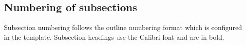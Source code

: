 \documentclass[10pt]{imeko_acta}
\begin{document}
\subsection{Numbering of subsections}

Subsection numbering follows the outline numbering format which is configured in the template. Subsection headings use the Calibri font and are in bold.






\end{document}
